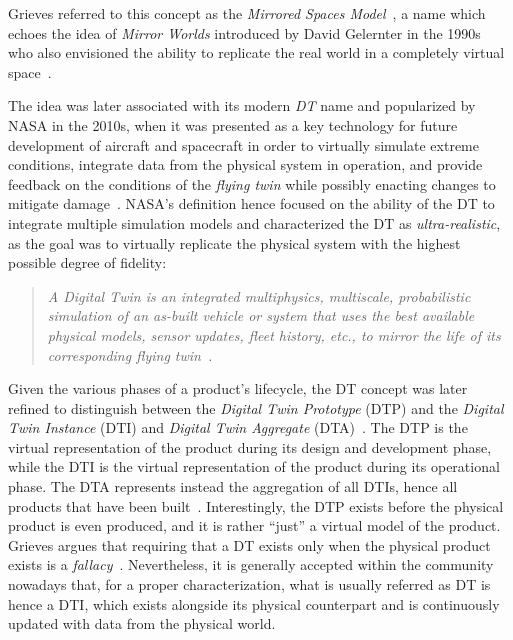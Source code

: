 Grieves referred to this concept as the \emph{Mirrored Spaces Model}~\cite{Grieves_2005},
a name which echoes the idea of \emph{Mirror Worlds} introduced by David Gelernter in the 1990s~\cite{gelernter1991mirrorworlds}
who also envisioned the ability to replicate the real world in a completely virtual space~\cite{Singh_Fuenmayor_Hinchy_Qiao_Murray_Devine_2021}.

The idea was later associated with its modern \emph{\acl{DT}} name and popularized by NASA in the 2010s, when it was presented as a key technology
for future development of aircraft and spacecraft in order to virtually simulate extreme conditions,
integrate data from the physical system in operation, 
and provide feedback on the conditions of the \emph{flying twin}
while possibly enacting changes to mitigate damage~\cite{glaessgen2012dtnasa}.
%
NASA's definition hence focused on the ability of the \ac{DT} to integrate multiple simulation models and characterized the \ac{DT} as \emph{ultra-realistic}, as the goal was to virtually replicate the physical system with the highest possible degree of fidelity:

\begin{quote}
\emph{
A Digital Twin is an integrated multiphysics, multiscale, probabilistic simulation of an as-built vehicle or system that uses the best available physical models, sensor updates, fleet history, etc., to mirror the life of its corresponding flying twin~\cite{glaessgen2012dtnasa}.
}
\end{quote}

Given the various phases of a product's lifecycle, the \ac{DT} concept was later
refined to distinguish between the \emph{Digital Twin Prototype} (DTP) and the \emph{Digital Twin Instance} (DTI) and \emph{Digital Twin Aggregate} (DTA)~\cite{Grieves2017}.
The DTP is the virtual representation of the product during its design and development phase,
while the DTI is the virtual representation of the product during its operational phase.
%
The DTA represents instead the aggregation of all DTIs, hence all products that have been built~\cite{Grieves_2022}.
%
Interestingly, the DTP exists before the physical product is even produced, 
and it is rather ``just'' a virtual model of the product. 
%
Grieves argues that requiring that a \ac{DT} exists only when the physical product exists is a \emph{fallacy}~\cite{Grieves_2022}.
%
Nevertheless, it is generally accepted within the community nowadays that, for a proper characterization, what is usually referred as \ac{DT} is hence a DTI, which exists alongside its physical counterpart and is continuously updated with data from the physical world. 

